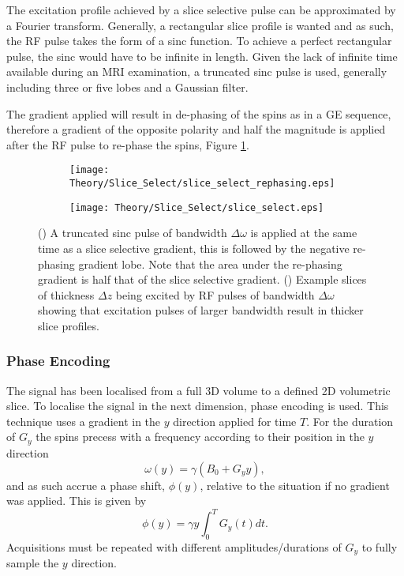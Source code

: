 The excitation profile achieved by a slice selective pulse can be approximated by a Fourier transform. Generally, a rectangular slice profile is wanted and as such, the \ac{RF} pulse takes the form of a sinc function. To achieve a perfect rectangular pulse, the sinc would have to be infinite in length. Given the lack of infinite time available during an \ac{MRI} examination, a truncated sinc pulse is used, generally including three or five lobes and a Gaussian filter.

The gradient applied will result in de-phasing of the spins as in a \ac{GE} sequence, therefore a gradient of the opposite polarity and half the magnitude is applied after the \ac{RF} pulse to re-phase the spins, Figure \ref{fig:theory_slice_select_rephasing}.

\begin{figure}[H]
	\centering
	\begin{subfigure}[c]{0.47\textwidth}
		\centering
		\texttt{[image: Theory/Slice\_Select/slice\_select\_rephasing.eps]}
		\caption{}
		\label{fig:theory_slice_select_rephasing}
	\end{subfigure}
	\hfill
	\begin{subfigure}[c]{0.47\textwidth}
		\centering
		\texttt{[image: Theory/Slice\_Select/slice\_select.eps]}
		\caption{}
		\label{fig:theory_slice_select_profile}
	\end{subfigure}
	\caption{() A truncated sinc pulse of bandwidth $\Delta \omega$ is applied at the same time as a slice selective gradient, this is followed by the negative re-phasing gradient lobe. Note that the area under the re-phasing gradient is half that of the slice selective gradient. () Example slices of thickness $\Delta z$ being excited by \ac{RF} pulses of bandwidth $\Delta \omega$ showing that excitation pulses of larger bandwidth result in thicker slice profiles.}
	\label{fig:theory_slice_select}
\end{figure}
\subsubsection{Phase Encoding}
The signal has been localised from a full 3D volume to a defined 2D volumetric slice. To localise the signal in the next dimension, phase encoding is used. This technique uses a gradient in the $y$ direction applied for time $T$. For the duration of $G_y$ the spins precess with a frequency according to their position in the $y$ direction
\begin{equation}
\omega \left( y\right) = \gamma\left( B_0 + G_yy\right),
\end{equation}
and as such accrue a phase shift, $\phi \left( y \right)$, relative to the situation if no gradient was applied. This is given by 
\begin{equation}
\phi\left( y\right)  = \gamma y \int_{0}^{T} G_y\left( t\right) dt.
\end{equation}
Acquisitions must be repeated with different amplitudes/durations of $G_y$ to fully sample the $y$ direction.

